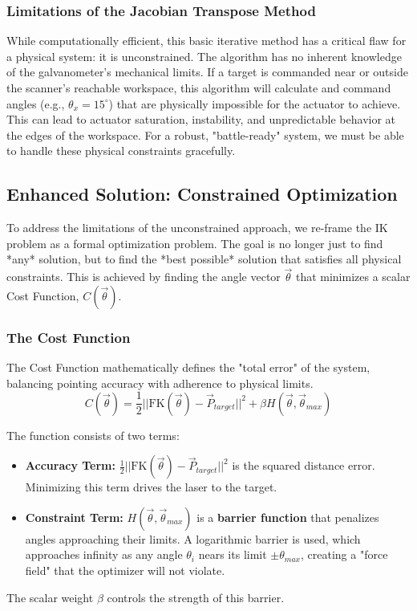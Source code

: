 \documentclass[12pt]{article}
\begin{document}
\subsubsection{Limitations of the Jacobian Transpose Method}
While computationally efficient, this basic iterative method has a critical flaw for a physical system: it is unconstrained. The algorithm has no inherent knowledge of the galvanometer's mechanical limits. If a target is commanded near or outside the scanner's reachable workspace, this algorithm will calculate and command angles (e.g., \(\theta_x = 15^\circ\)) that are physically impossible for the actuator to achieve. This can lead to actuator saturation, instability, and unpredictable behavior at the edges of the workspace. For a robust, "battle-ready" system, we must be able to handle these physical constraints gracefully.

\subsection{Enhanced Solution: Constrained Optimization}

To address the limitations of the unconstrained approach, we re-frame the IK problem as a formal optimization problem. The goal is no longer just to find *any* solution, but to find the *best possible* solution that satisfies all physical constraints. This is achieved by finding the angle vector \(\vec{\theta}\) that minimizes a scalar Cost Function, \(C(\vec{\theta})\).

\subsubsection{The Cost Function}
The Cost Function mathematically defines the "total error" of the system, balancing pointing accuracy with adherence to physical limits.
\begin{equation}
C(\vec{\theta}) = \frac{1}{2} || \text{FK}(\vec{\theta}) - \vec{P}_{target} ||^2 + \beta H(\vec{\theta}, \vec{\theta}_{max})
\label{eq:cost_function}
\end{equation}

The function consists of two terms:
\begin{itemize}
\item \textbf{Accuracy Term:} \(\frac{1}{2} || \text{FK}(\vec{\theta}) - \vec{P}_{target} ||^2\) is the squared distance error. Minimizing this term drives the laser to the target.
\item \textbf{Constraint Term:} \(H(\vec{\theta}, \vec{\theta}_{max})\) is a \textbf{barrier function} that penalizes angles approaching their limits. A logarithmic barrier is used, which approaches infinity as any angle \(\theta_i\) nears its limit \(\pm\theta_{max}\), creating a "force field" that the optimizer will not violate.
\end{itemize}
The scalar weight \(\beta\) controls the strength of this barrier.
\end{document}
